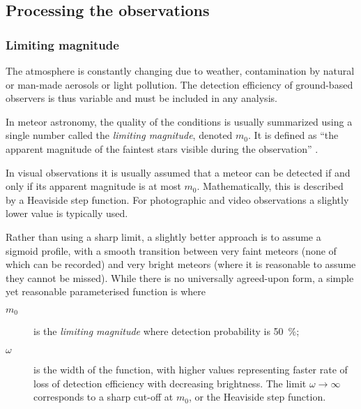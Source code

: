     \subsection{Processing the observations} \label{msp}
        \subsubsection{Limiting magnitude} \label{ipqm}
            The atmosphere is constantly changing due to weather, contamination
            by natural or man-made aerosols or light pollution. The detection efficiency
            of ground-based observers is thus variable and must be included in any analysis.

            In meteor astronomy, the quality of the conditions is usually summarized
            using a single number called the \emph{limiting magnitude}, denoted $m_0$.
            It is defined as ``the apparent magnitude of the faintest stars visible during the observation'' \citep{imo-glossary}.

            In visual observations it is usually assumed that a meteor can be detected if and only if
            its apparent magnitude is at most $m_0$. Mathematically, this is described by a Heaviside step function.
            For photographic and video observations a slightly lower value is typically used.

            Rather than using a sharp limit, a slightly better approach is to assume a sigmoid profile,
            with a smooth transition between very faint meteors (none of which can be recorded)
            and very bright meteors (where it is reasonable to assume they cannot be missed).
            While there is no universally agreed-upon form, a simple yet reasonable parameterised function is
            where
            \begin{description}
                \item[$m_0$]    is the \textit{limiting magnitude} where detection probability is \SI{50}{\percent};
                \item[$\omega$] is the width of the function, with higher values representing
                    faster rate of loss of detection efficiency with decreasing brightness.
                    The limit $\omega \to \infty$ corresponds to a sharp cut-off at $m_0$,
                    or the Heaviside step function.
            \end{description}


